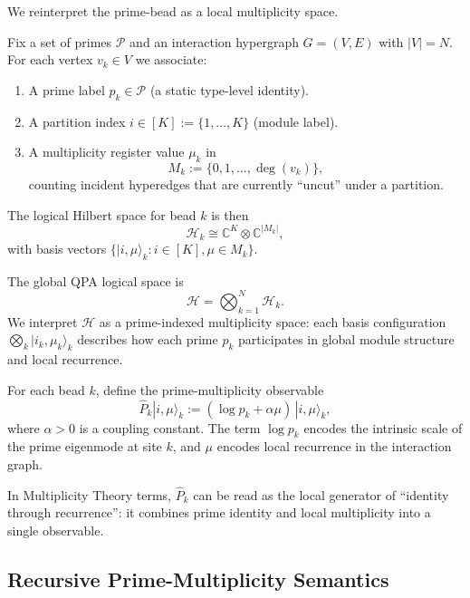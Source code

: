 \documentclass[11pt]{article}
\begin{document}
We reinterpret the prime-bead as a local multiplicity space.

\begin{definition}
Fix a set of primes $\mathcal{P}$ and an interaction hypergraph $G=(V,E)$ with $|V| = N$. For each vertex $v_k \in V$ we associate:
\begin{enumerate}[label=(\roman*)]
  \item A prime label $p_k \in \mathcal{P}$ (a static type-level identity).
  \item A partition index $i \in [K] := \{1,\dots,K\}$ (module label).
  \item A multiplicity register value $\mu_k$ in
  \[
    M_k := \{0,1,\dots,\deg(v_k)\},
  \]
  counting incident hyperedges that are currently ``uncut'' under a partition.
\end{enumerate}
The logical Hilbert space for bead $k$ is then
\[
  \mathcal{H}_k \cong \mathbb{C}^K \otimes \mathbb{C}^{|M_k|},
\]
with basis vectors $\{|i,\mu\rangle_k : i \in [K], \mu \in M_k\}$.
\end{definition}

\begin{definition}
The global QPA logical space is
\[
  \mathcal{H} = \bigotimes_{k=1}^N \mathcal{H}_k.
\]
We interpret $\mathcal{H}$ as a prime-indexed multiplicity space: each basis configuration $\bigotimes_k |i_k,\mu_k\rangle_k$ describes how each prime $p_k$ participates in global module structure and local recurrence.
\end{definition}

\begin{definition}
For each bead $k$, define the prime-multiplicity observable
\[
  \hat{P}_k |i,\mu\rangle_k
    := (\log p_k + \alpha \mu)\,|i,\mu\rangle_k,
\]
where $\alpha > 0$ is a coupling constant. The term $\log p_k$ encodes the intrinsic scale of the prime eigenmode at site $k$, and $\mu$ encodes local recurrence in the interaction graph.
\end{definition}

In Multiplicity Theory terms, $\hat{P}_k$ can be read as the local generator of ``identity through recurrence'': it combines prime identity and local multiplicity into a single observable.

\subsection{Recursive Prime-Multiplicity Semantics}
\end{document}

